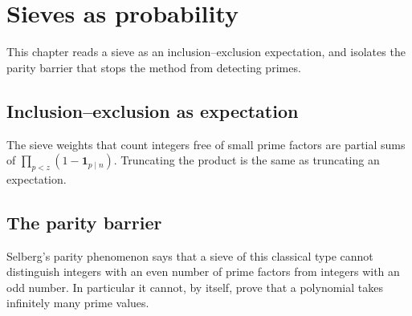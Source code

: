 \chapter{Sieves as probability}\label{ch:oc-sieves}

This chapter reads a sieve as an inclusion--exclusion expectation, and isolates the parity barrier that stops the method from detecting primes.

\section{Inclusion--exclusion as expectation}

The sieve weights that count integers free of small prime factors are partial sums of $\prod_{p<z}(1-\mathbf 1_{p\mid n})$. Truncating the product is the same as truncating an expectation.

\section{The parity barrier}

Selberg's parity phenomenon says that a sieve of this classical type cannot distinguish integers with an even number of prime factors from integers with an odd number. In particular it cannot, by itself, prove that a polynomial takes infinitely many prime values.
